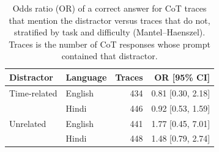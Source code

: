 \begin{table}[ht]
\centering
\small
\begin{tabular}{llrr}
\toprule
Distractor & Language & Traces & OR [95\% CI] \\
\midrule
Time-related & English & 434 & 0.81 [0.30, 2.18] \\
 & Hindi & 446 & 0.92 [0.53, 1.59] \\
\midrule
Unrelated & English & 441 & 1.77 [0.45, 7.01] \\
 & Hindi & 448 & 1.48 [0.79, 2.74] \\
\bottomrule
\end{tabular}
\caption{Odds ratio (OR) of a correct answer for CoT traces that mention the distractor versus traces that do not, stratified by task and difficulty (Mantel--Haenszel). Traces is the number of CoT responses whose prompt contained that distractor.}
\label{tab:mention-or}
\end{table}
